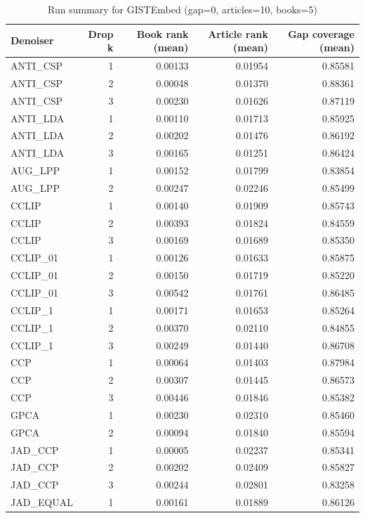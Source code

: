 \begin{table}
\caption{Run summary for GISTEmbed (gap=0, articles=10, books=5)}
\label{tab:summary_gap0_gistembed_a10_b5}
\begin{tabular}{lrrrr}
\toprule
Denoiser & Drop k & Book rank (mean) & Article rank (mean) & Gap coverage (mean) \\
\midrule
ANTI\_CSP & 1 & 0.00133 & 0.01954 & 0.85581 \\
ANTI\_CSP & 2 & 0.00048 & 0.01370 & 0.88361 \\
ANTI\_CSP & 3 & 0.00230 & 0.01626 & 0.87119 \\
\hline
ANTI\_LDA & 1 & 0.00110 & 0.01713 & 0.85925 \\
ANTI\_LDA & 2 & 0.00202 & 0.01476 & 0.86192 \\
ANTI\_LDA & 3 & 0.00165 & 0.01251 & 0.86424 \\
\hline
AUG\_LPP & 1 & 0.00152 & 0.01799 & 0.83854 \\
AUG\_LPP & 2 & 0.00247 & 0.02246 & 0.85499 \\
\hline
CCLIP & 1 & 0.00140 & 0.01909 & 0.85743 \\
CCLIP & 2 & 0.00393 & 0.01824 & 0.84559 \\
CCLIP & 3 & 0.00169 & 0.01689 & 0.85350 \\
\hline
CCLIP\_01 & 1 & 0.00126 & 0.01633 & 0.85875 \\
CCLIP\_01 & 2 & 0.00150 & 0.01719 & 0.85220 \\
CCLIP\_01 & 3 & 0.00542 & 0.01761 & 0.86485 \\
\hline
CCLIP\_1 & 1 & 0.00171 & 0.01653 & 0.85264 \\
CCLIP\_1 & 2 & 0.00370 & 0.02110 & 0.84855 \\
CCLIP\_1 & 3 & 0.00249 & 0.01440 & 0.86708 \\
\hline
CCP & 1 & 0.00064 & 0.01403 & 0.87984 \\
CCP & 2 & 0.00307 & 0.01445 & 0.86573 \\
CCP & 3 & 0.00446 & 0.01846 & 0.85382 \\
\hline
GPCA & 1 & 0.00230 & 0.02310 & 0.85460 \\
GPCA & 2 & 0.00094 & 0.01840 & 0.85594 \\
\hline
JAD\_CCP & 1 & 0.00005 & 0.02237 & 0.85341 \\
JAD\_CCP & 2 & 0.00202 & 0.02409 & 0.85827 \\
JAD\_CCP & 3 & 0.00244 & 0.02801 & 0.83258 \\
\hline
JAD\_EQUAL & 1 & 0.00161 & 0.01889 & 0.86126 \\

\end{tabular}
\end{table}
